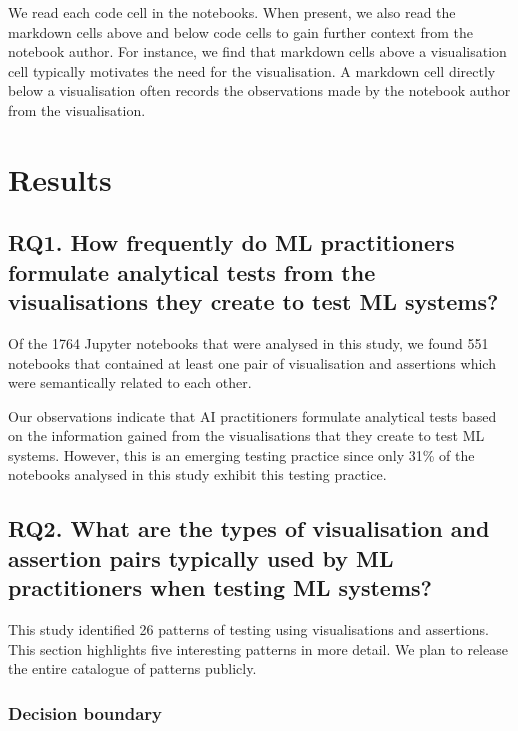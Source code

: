 \documentclass[conference]{IEEEtran}
\begin{document}
We read each code cell in the notebooks. When present, we also read the markdown cells above and below code cells to gain further context from the notebook author. For instance, we find that markdown cells above a visualisation cell typically motivates the need for the visualisation. A markdown cell directly below a visualisation often records the observations made by the notebook author from the visualisation.


\section{Results}\label{sec:result}
\subsection{RQ1. How frequently do ML practitioners formulate analytical tests from the visualisations they create to test ML systems?}\label{sec:result-rq1}

Of the 1764 Jupyter notebooks that were analysed in this study, we found 551 notebooks that contained at least one pair of visualisation and assertions which were semantically related to each other.

Our observations indicate that AI practitioners formulate analytical tests based on the information gained from the visualisations that they create to test ML systems. However, this is an emerging testing practice since only 31\% of the notebooks analysed in this study exhibit this testing practice.

\subsection{RQ2. What are the types of visualisation and assertion pairs typically used by ML practitioners when testing ML systems?}\label{sec:result-rq2}

This study identified 26 patterns of testing using visualisations and assertions. This section highlights five interesting patterns in more detail. We plan to release the entire catalogue of patterns publicly.

\subsubsection{Decision boundary}\label{sec:svm}
\end{document}
